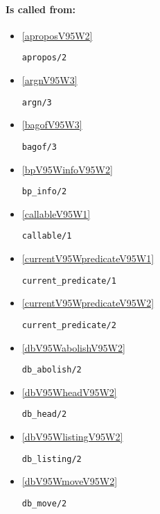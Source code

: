 \paragraph{Is called from:} 
\begin{itemize}
\item \ref{aproposV95W2} 
\begin{verbatim}
apropos/2
\end{verbatim}

\item \ref{argnV95W3} 
\begin{verbatim}
argn/3
\end{verbatim}

\item \ref{bagofV95W3} 
\begin{verbatim}
bagof/3
\end{verbatim}

\item \ref{bpV95WinfoV95W2} 
\begin{verbatim}
bp_info/2
\end{verbatim}

\item \ref{callableV95W1} 
\begin{verbatim}
callable/1
\end{verbatim}

\item \ref{currentV95WpredicateV95W1} 
\begin{verbatim}
current_predicate/1
\end{verbatim}

\item \ref{currentV95WpredicateV95W2} 
\begin{verbatim}
current_predicate/2
\end{verbatim}

\item \ref{dbV95WabolishV95W2} 
\begin{verbatim}
db_abolish/2
\end{verbatim}

\item \ref{dbV95WheadV95W2} 
\begin{verbatim}
db_head/2
\end{verbatim}

\item \ref{dbV95WlistingV95W2} 
\begin{verbatim}
db_listing/2
\end{verbatim}

\item \ref{dbV95WmoveV95W2} 
\begin{verbatim}
db_move/2
\end{verbatim}


\end{itemize}
